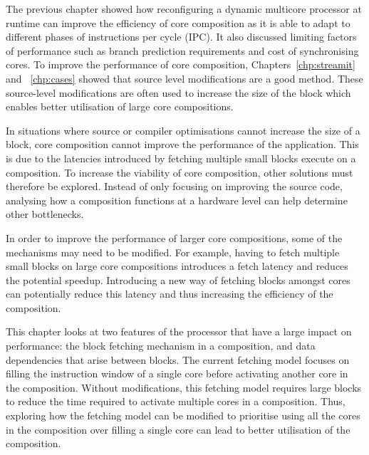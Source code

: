 The previous chapter showed how reconfiguring a dynamic multicore processor at runtime can improve the efficiency of core composition as it is able to adapt to different phases of instructions per cycle (IPC).
It also discussed limiting factors of performance such as branch prediction requirements and cost of synchronising cores.
To improve the performance of core composition, Chapters~\ref{chp:streamit} and ~\ref{chp:cases} showed that source level modifications are a good method.
These source-level modifications are often used to increase the size of the block which enables better utilisation of large core compositions.

In situations where source or compiler optimisations cannot increase the size of a block, core composition cannot improve the performance of the application.
This is due to the latencies introduced by fetching multiple small blocks execute on a composition.
To increase the viability of core composition, other solutions must therefore be explored.
Instead of only focusing on improving the source code, analysing how a composition functions at a hardware level can help determine other bottlenecks.

In order to improve the performance of larger core compositions, some of the mechanisms may need to be modified.%
For example, having to fetch multiple small blocks on large core compositions introduces a fetch latency and reduces the potential speedup.
Introducing a new way of fetching blocks amongst cores can potentially reduce this latency and thus increasing the efficiency of the composition.

This chapter looks at two features of the processor that have a large impact on performance: the block fetching mechanism in a composition, and data dependencies that arise between blocks.
The current fetching model focuses on filling the instruction window of a single core before activating another core in the composition.
Without modifications, this fetching model requires large blocks to reduce the time required to activate multiple cores in a composition.
Thus, exploring how the fetching model can be modified to prioritise using all the cores in the composition over filling a single core can lead to better utilisation of the composition.

